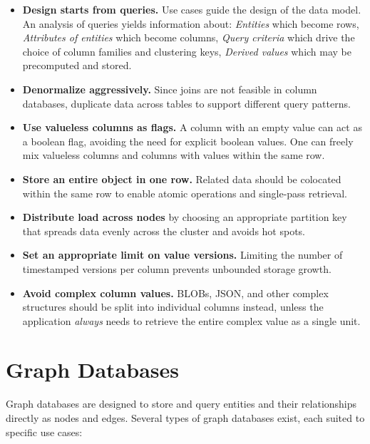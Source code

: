\begin{itemize}
    \item \textbf{Design starts from queries.} Use cases guide the design of the data model. An analysis of queries yields information about: \emph{Entities} which become rows, \emph{Attributes of entities} which become columns, \emph{Query criteria} which drive the choice of column families and clustering keys, \emph{Derived values} which may be precomputed and stored.
    
    \item \textbf{Denormalize aggressively.} Since joins are not feasible in column databases, duplicate data across tables to support different query patterns.
    
    \item \textbf{Use valueless columns as flags.} A column with an empty value can act as a boolean flag, avoiding the need for explicit boolean values. One can freely mix valueless columns and columns with values within the same row.
    
    \item \textbf{Store an entire object in one row.} Related data should be colocated within the same row to enable atomic operations and single-pass retrieval.
    
    \item \textbf{Distribute load across nodes} by choosing an appropriate partition key that spreads data evenly across the cluster and avoids hot spots.
    
    \item \textbf{Set an appropriate limit on value versions.} Limiting the number of timestamped versions per column prevents unbounded storage growth.
    
    \item \textbf{Avoid complex column values.} BLOBs, JSON, and other complex structures should be split into individual columns instead, unless the application \emph{always} needs to retrieve the entire complex value as a single unit.
\end{itemize}

\section{Graph Databases}

Graph databases are designed to store and query entities and their relationships directly as nodes and edges. Several types of graph databases exist, each suited to specific use cases:

